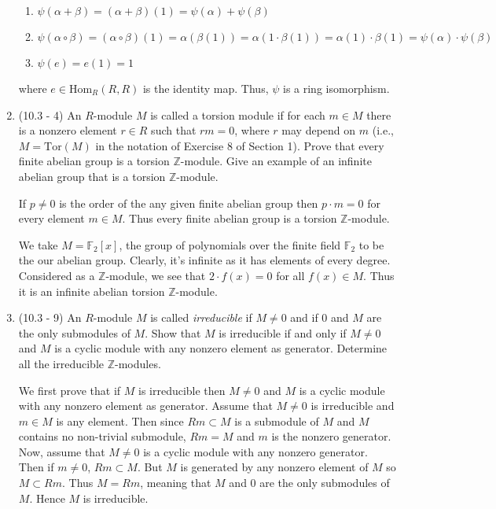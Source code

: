 \documentclass[12pt]{article}
\newcommand{\mz}{\mathbb{Z}}
\renewcommand{\hom}[1]{\text{Hom}_{#1}}
\newcommand{\tor}{\text{Tor}}
\begin{document}
\begin{enumerate}
\begin{mybox}
    \vspace*{2mm}
    \begin{enumerate}
        \item $\psi(\alpha+\beta)=(\alpha+\beta)(1)=
            \psi(\alpha)+\psi(\beta)$
        \item $\psi(\alpha\circ\beta)=(\alpha\circ\beta)(1)
            =\alpha(\beta(1))=\alpha(1\cdot\beta(1))=
            \alpha(1)\cdot\beta(1)=
            \psi(\alpha)\cdot\psi(\beta)$
        \item $\psi(e)=e(1)=1$
    \end{enumerate}
    where $e\in\hom{R}(R,R)$ is the identity map. Thus,
    $\psi$ is a ring isomorphism.
\end{mybox}

\item (10.3 - 4) An $R$-module $M$ is called a torsion
module if for each $m\in M$ there is a nonzero element
$r\in R$ such that $rm = 0$, where $r$ may depend on $m$
(i.e., $M = \tor(M)$ in the notation of Exercise 8 of
Section 1). Prove that every finite abelian group is a
torsion $\mz$-module. Give an example of an infinite
abelian group that is a torsion $\mz$-module.
\begin{mybox}

    If $p\neq 0$ is the order of the any given finite
    abelian group then $p\cdot m=0$ for every element
    $m\in M$. Thus every finite abelian group is a
    torsion $\mz$-module.
    
    \vspace*{2mm}
    We take $M=\mathbb{F}_2[x]$, the group of polynomials
    over the finite field $\mathbb{F}_2$ to be the our
    abelian group. Clearly, it's infinite as it has
    elements of every degree. Considered as a $\mz$-module,
    we see that $2\cdot f(x)=0$ for all $f(x)\in M$.
    Thus it is an infinite abelian torsion $\mz$-module.

\end{mybox}

\item (10.3 - 9) An $R$-module $M$ is called
\emph{irreducible} if $M\neq 0$ and if 0 and $M$ are the
only submodules of $M$. Show that $M$ is irreducible if
and only if $M\neq 0$ and $M$ is a cyclic module with any
nonzero element as generator. Determine all
the irreducible $\mz$-modules.
\begin{mybox}
    We first prove that if $M$ is irreducible then $M\neq
    0$ and $M$ is a cyclic module with any nonzero
    element as generator. Assume that $M\neq 0$ is
    irreducible and $m\in M$ is any element.
    Then since $Rm\subset M$ is a submodule of $M$ and $M$
    contains no non-trivial submodule, $Rm=M$ and $m$ is
    the nonzero generator. Now, assume that $M\neq 0$ is
    a cyclic module with any nonzero generator. Then if
    $m\neq 0$, $Rm\subset M$. But $M$ is generated by any
    nonzero element of $M$ so $M\subset Rm$. Thus $M=Rm$,
    meaning that $M$ and 0 are the only submodules of $M$.
    Hence $M$ is irreducible.


\end{mybox}
\end{enumerate}
\end{document}

